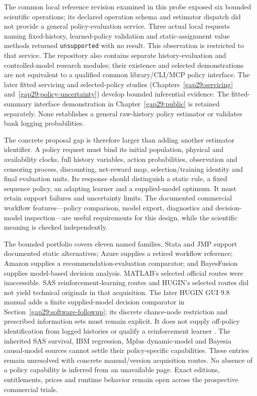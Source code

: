 The common local reference revision examined in this probe exposed six
bounded scientific operations; its declared operation schema and estimator
dispatch did not provide a general policy-evaluation service. Three actual local requests naming fixed-history,
learned-policy validation and static-assignment value methods returned
\texttt{unsupported} with no result. This observation is restricted to that
service. The repository also contains separate history-evaluation and
controlled-model research modules; their existence and selected demonstrations
are not equivalent to a qualified common library/CLI/MCP policy interface.
The later fitted servicing and selected-policy studies
(Chapters~\ref{gap29:servicing} and~\ref{gap29:policy-uncertainty}) develop
bounded inferential evidence. The fitted-summary interface demonstration in
Chapter~\ref{gap29:public} is retained separately. None establishes a general
raw-history policy estimator or validates bank logging probabilities.
\citep{exec16_cp_runtime}

The concrete proposal gap is therefore larger than adding another estimator
identifier. A policy request must bind its initial population, physical and
availability clocks, full history variables, action probabilities, observation
and censoring process, discounting, net-reward map, selection/training identity
and final evaluation units. Its response should distinguish a static rule,
a fixed sequence policy, an adapting learner and a supplied-model optimum.
It must retain support failures and uncertainty limits. The documented
commercial workflow features---policy comparison, model export, diagnostics
and decision-model inspection---are useful requirements for this design, while
the scientific meaning is checked independently. \citep{exec16_cp_matrix}

The bounded portfolio covers eleven named families. Stata and JMP support
documented static alternatives; Azure supplies a retired workflow reference;
Amazon supplies a recommendation-evaluation comparator; and BayesFusion
supplies model-based decision analysis. MATLAB's selected official routes were
inaccessible. SAS reinforcement-learning routes and HUGIN's selected routes
did not yield technical originals in that acquisition. The later HUGIN GUI
9.8 manual adds a finite supplied-model decision comparator in
Section~\ref{gap29:software-followup}; its discrete chance-node restriction
and prescribed information sets must remain explicit. It does not supply
off-policy identification from logged histories or qualify a reinforcement
learner \citep{gap29hugin}. The inherited SAS survival, IBM regression,
Mplus dynamic-model and Bayesia causal-model sources cannot settle their
policy-specific capabilities. These entries remain unresolved with concrete
manual/version acquisition routes. No absence of a policy capability is
inferred from an unavailable page. Exact editions, entitlements, prices and
runtime behavior remain open across the prospective commercial trials.
\citep{exec16_cp_matrix}

